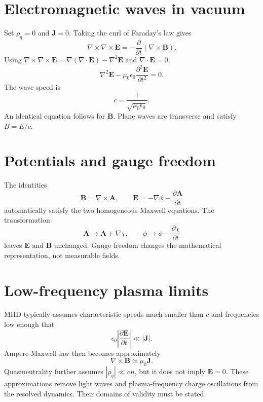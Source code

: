 \documentclass[11pt]{article}
\begin{document}
\section{Electromagnetic waves in vacuum}

Set $\rho_q=0$ and $\mathbf J=0$. Taking the curl of Faraday's law gives
\begin{equation}
\nabla\times\nabla\times\mathbf E
=-\frac{\partial}{\partial t}\left(\nabla\times\mathbf B\right).
\end{equation}
Using $\nabla\times\nabla\times\mathbf E=\nabla(\nabla\cdot\mathbf E)-\nabla^2\mathbf E$ and $\nabla\cdot\mathbf E=0$,
\begin{equation}
\nabla^2\mathbf E-\mu_0\epsilon_0\frac{\partial^2\mathbf E}{\partial t^2}=0.
\end{equation}
The wave speed is
\begin{equation}
c=\frac{1}{\sqrt{\mu_0\epsilon_0}}.
\end{equation}
An identical equation follows for $\mathbf B$. Plane waves are transverse and satisfy $B=E/c$.


\section{Potentials and gauge freedom}

The identities
\begin{equation}
\mathbf B=\nabla\times\mathbf A,\qquad
\mathbf E=-\nabla\phi-\frac{\partial\mathbf A}{\partial t}
\end{equation}
automatically satisfy the two homogeneous Maxwell equations. The transformation
\begin{equation}
\mathbf A\rightarrow\mathbf A+\nabla\chi,\qquad
\phi\rightarrow\phi-\frac{\partial\chi}{\partial t}
\end{equation}
leaves $\mathbf E$ and $\mathbf B$ unchanged. Gauge freedom changes the mathematical representation, not measurable fields.


\section{Low-frequency plasma limits}

MHD typically assumes characteristic speeds much smaller than $c$ and frequencies low enough that
\begin{equation}
\epsilon_0\left|\frac{\partial\mathbf E}{\partial t}\right|\ll |\mathbf J|.
\end{equation}
Ampere-Maxwell law then becomes approximately
\begin{equation}
\nabla\times\mathbf B\simeq\mu_0\mathbf J.
\end{equation}
Quasineutrality further assumes $|\rho_q|\ll en$, but it does not imply $\mathbf E=0$. These approximations remove light waves and plasma-frequency charge oscillations from the resolved dynamics. Their domains of validity must be stated.
\end{document}
